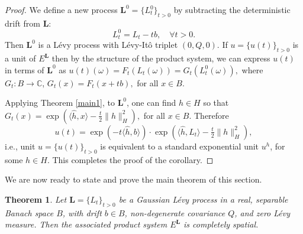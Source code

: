 \documentclass[11pt]{amsart}
\newtheorem{theorem}{Theorem}[section]
\theoremstyle{definition}
\theoremstyle{remark}
\numberwithin{equation}{section}
\begin{document}
\begin{proof}
We define a new process \( \bm{L}^0 = \{L_t^0\}_{t > 0} \) by subtracting the deterministic drift from \( \bm{L} \):
\[
L_t^0 = L_t - t b, \quad \forall t > 0.
\] Then \( \bm{L}^0 \) is a L\'evy process with L\'evy-It\^o triplet $(0, Q, 0)$. If \( u = \{u(t)\}_{t > 0} \) is a unit of \( E^{\bm{L}} \) then by the structure of the product system, we can express \( u(t) \) in terms of \( \bm{L}^0 \) as \(u(t)(\omega) = F_t(L_t(\omega)) = G_t(L_t^0(\omega)),\) where \( G_t: B \to \mathbb{C} \), \(G_t(x) = F_t(x + t b),\) for all \(x \in B.\)

Applying Theorem \ref{main1}, to \( \bm{L}^0 \), one can find $h\in H$ so that \(
G_t(x) = \exp\left( \langle \hat{h}, x \rangle - \tfrac{t}{2} \| {h} \|_H^2 \right),\) for all \(x \in B.
\) Therefore \[
u(t)= \exp\left( - t \langle \hat{h}, b \rangle \right)\cdot\exp\left( \langle\hat{h}, L_t\rangle - \tfrac{t}{2} \| h \|_H^2 \right),
\]  i.e., unit \( u = \{ u(t) \}_{t > 0} \) is equivalent to a standard exponential unit \( u^h \), for some \(h \in H \). This completes the proof of the corollary.\end{proof}
We are now ready to state and prove the main theorem of this section.
\begin{theorem}\label{theorem:completely_spatial}
Let \( \bm{L} = \{ L_t \}_{t > 0} \) be a Gaussian L\'evy process in a real, separable Banach space \( B \), with drift \( b \in B \), non-degenerate covariance \( Q \), and zero L\'evy measure. Then the associated product system \( E^{\bm{L}} \) is completely spatial.
\end{theorem}
\end{document}
